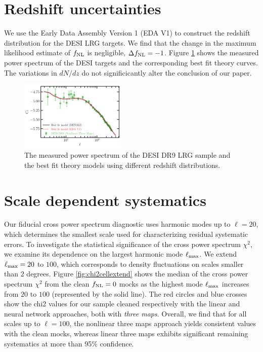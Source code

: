\section{Redshift uncertainties}
We use the Early Data Assembly Version 1 (EDA V1) to construct the redshift distribution for the DESI LRG targets. We find that the change in the maximum likelihood estimate of $f_{\rm NL}$ is negligible, $\Delta f_{\rm NL}=-1$. Figure \ref{fig:cl_nz} shows the measured power spectrum of the DESI targets and the corresponding best fit theory curves. The variations in $dN/dz$ do not significicantly alter the conclusion of our paper.
\begin{figure}
\centering
\includegraphics[width=0.45\textwidth]{figures/cl_nz.pdf}\caption{The measured power spectrum of the DESI DR9 LRG sample and the best fit theory models using different redshift distributions.}\label{fig:cl_nz}
\end{figure}

\section{Scale dependent systematics}\label{sec:scalesys}
Our fiducial cross power spectrum diagnostic uses harmonic modes up to $\ell=20$, which determines the smallest scale used for characterizing residual systematic errors. To investigate the statistical significance of the cross power spectrum $\chi^{2}$, we examine its dependence on the largest harmonic mode $\ell_{\rm max}$. We extend $\ell_{\rm max}=20$ to $100$, which corresponds to density fluctuations on scales smaller than $2$ degrees. Figure \ref{fig:chi2cellextend} shows the median of the cross power spectrum $\chi^{2}$ from the clean $f_{\rm NL}=0$ mocks as the highest mode $\ell_{\rm max}$ increases from $20$ to $100$ (represented by the solid line). The red circles and blue crosses show the chi2 values for our sample cleaned respectively with the linear and neural network approaches, both with \textit{three maps}. Overall, we find that for all scales up to $\ell=100$, the nonlinear three maps approach yields consistent values with the clean mocks, whereas linear three maps exhibits significant remaining systematics at more than 95\% confidence.

